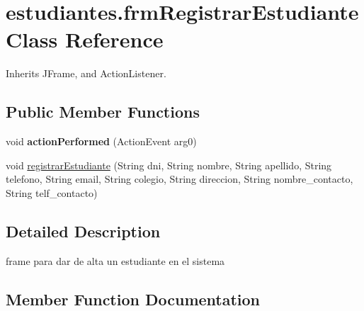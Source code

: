 \hypertarget{classestudiantes_1_1frm_registrar_estudiante}{}\section{estudiantes.\+frm\+Registrar\+Estudiante Class Reference}
\label{classestudiantes_1_1frm_registrar_estudiante}


Inherits J\+Frame, and Action\+Listener.

\subsection*{Public Member Functions}
\begin{DoxyCompactItemize}
\item 
\mbox{\label{classestudiantes_1_1frm_registrar_estudiante_a646e80c92f09cd6cab1ba25d745f67ee}} 
void {\bfseries action\+Performed} (Action\+Event arg0)
\item 
void \hyperlink{classestudiantes_1_1frm_registrar_estudiante_adf2c7edcbb13872ffa1bb56e01e4c8cb}{registrar\+Estudiante} (String dni, String nombre, String apellido, String telefono, String email, String colegio, String direccion, String nombre\+\_\+contacto, String telf\+\_\+contacto)
\end{DoxyCompactItemize}


\subsection{Detailed Description}
frame para dar de alta un estudiante en el sistema 

\subsection{Member Function Documentation}
\mbox{\label{classestudiantes_1_1frm_registrar_estudiante_adf2c7edcbb13872ffa1bb56e01e4c8cb}} 
